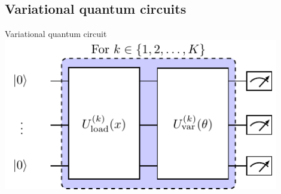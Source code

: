 \subsection{Variational quantum circuits}
\begin{frame}{Variational quantum circuit}
    \centering
    \includegraphics[width=0.9\textwidth]{pics/qnn/variational_circuit.pdf}
\end{frame}
